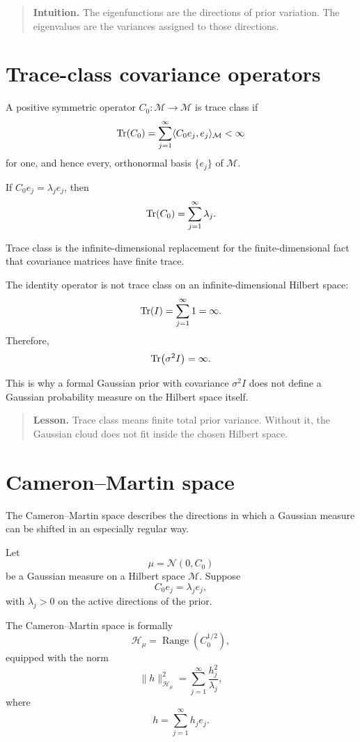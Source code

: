 \documentclass[11pt,a4paper]{book}
\newenvironment{intuition}
  {\begin{quote}\textbf{Intuition.}}
  {\end{quote}}
\newenvironment{lesson}
  {\begin{quote}\textbf{Lesson.}}
  {\end{quote}}
\newcommand{\M}{\mathcal{M}}      %
\begin{document}
\begin{intuition}
The eigenfunctions are the directions of prior variation. The eigenvalues are
the variances assigned to those directions.
\end{intuition}

\section{Trace-class covariance operators}

A positive symmetric operator $C_0:\M\to\M$ is trace class if
\[
    \Tr(C_0)
    =
    \sum_{j=1}^{\infty}
    \langle C_0e_j,e_j\rangle_{\M}
    <
    \infty
\]
for one, and hence every, orthonormal basis $\{e_j\}$ of $\M$.

If $C_0e_j=\lambda_j e_j$, then
\[
    \Tr(C_0)
    =
    \sum_{j=1}^{\infty}\lambda_j.
\]

Trace class is the infinite-dimensional replacement for the finite-dimensional
fact that covariance matrices have finite trace.

The identity operator is not trace class on an infinite-dimensional Hilbert
space:
\[
    \Tr(I)
    =
    \sum_{j=1}^{\infty}1
    =
    \infty.
\]
Therefore,
\[
    \Tr(\sigma^2 I)
    =
    \infty.
\]

This is why a formal Gaussian prior with covariance $\sigma^2 I$ does not
define a Gaussian probability measure on the Hilbert space itself.

\begin{lesson}
Trace class means finite total prior variance. Without it, the Gaussian cloud
does not fit inside the chosen Hilbert space.
\end{lesson}

\section{Cameron--Martin space}

The Cameron--Martin space describes the directions in which a Gaussian measure
can be shifted in an especially regular way.

Let
\[
    \mu=\mathcal{N}(0,C_0)
\]
be a Gaussian measure on a Hilbert space $\M$. Suppose
\[
    C_0e_j=\lambda_j e_j,
\]
with $\lambda_j>0$ on the active directions of the prior.

The Cameron--Martin space is formally
\[
    \mathcal{H}_{\mu}
    =
    \operatorname{Range}(C_0^{1/2}),
\]
equipped with the norm
\[
    \|h\|_{\mathcal{H}_{\mu}}^2
    =
    \sum_{j=1}^{\infty}
    \frac{h_j^2}{\lambda_j},
\]
where
\[
    h=\sum_{j=1}^{\infty}h_j e_j.
\]
\end{document}
